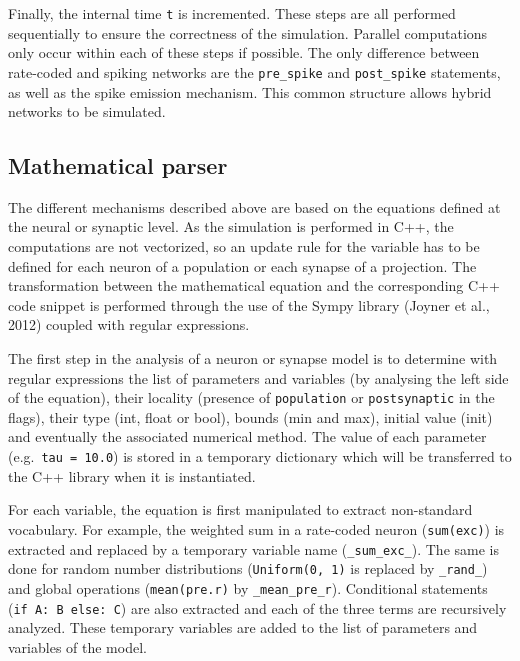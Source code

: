 \documentclass[
  11pt,
  a4paper,
]{scrbook}
\begin{document}
Finally, the internal time \texttt{t} is incremented. These steps are
all performed sequentially to ensure the correctness of the simulation.
Parallel computations only occur within each of these steps if possible.
The only difference between rate-coded and spiking networks are the
\texttt{pre\_spike} and \texttt{post\_spike} statements, as well as the
spike emission mechanism. This common structure allows hybrid networks
to be simulated.

\subsection{Mathematical parser}\label{mathematical-parser}

The different mechanisms described above are based on the equations
defined at the neural or synaptic level. As the simulation is performed
in C++, the computations are not vectorized, so an update rule for the
variable has to be defined for each neuron of a population or each
synapse of a projection. The transformation between the mathematical
equation and the corresponding C++ code snippet is performed through the
use of the Sympy library (Joyner et al., 2012) coupled with regular
expressions.

The first step in the analysis of a neuron or synapse model is to
determine with regular expressions the list of parameters and variables
(by analysing the left side of the equation), their locality (presence
of \texttt{population} or \texttt{postsynaptic} in the flags), their
type (int, float or bool), bounds (min and max), initial value (init)
and eventually the associated numerical method. The value of each
parameter (e.g.~\texttt{tau\ =\ 10.0}) is stored in a temporary
dictionary which will be transferred to the C++ library when it is
instantiated.

For each variable, the equation is first manipulated to extract
non-standard vocabulary. For example, the weighted sum in a rate-coded
neuron (\texttt{sum(exc)}) is extracted and replaced by a temporary
variable name (\texttt{\_sum\_exc\_}). The same is done for random
number distributions (\texttt{Uniform(0,\ 1)} is replaced by
\texttt{\_rand\_}) and global operations (\texttt{mean(pre.r)} by
\texttt{\_mean\_pre\_r}). Conditional statements
(\texttt{if\ A:\ B\ else:\ C}) are also extracted and each of the three
terms are recursively analyzed. These temporary variables are added to
the list of parameters and variables of the model.
\end{document}
